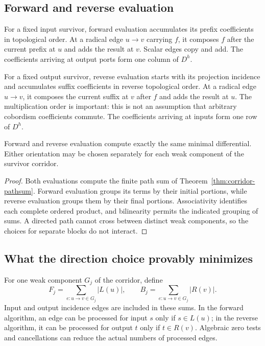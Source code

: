 \subsection{Forward and reverse evaluation}

For a fixed input survivor, forward evaluation accumulates its prefix
coefficients in topological order.  At a radical edge $u\to v$ carrying $f$,
it composes $f$ after the current prefix at $u$ and adds the result at $v$.
Scalar edges copy and add.  The coefficients arriving at output ports form
one column of $D^h$.

For a fixed output survivor, reverse evaluation starts with its projection
incidence and accumulates suffix coefficients in reverse topological order.
At a radical edge $u\to v$, it composes the current suffix at $v$ after $f$
and adds the result at $u$.  The multiplication order is important: this is
not an assumption that arbitrary cobordism coefficients commute.  The
coefficients arriving at inputs form one row of $D^h$.

\begin{theorem}
\label{thm:corridor-bidirectional}
Forward and reverse evaluation compute exactly the same minimal
differential.  Either orientation may be chosen separately for each weak
component of the survivor corridor.
\end{theorem}
\begin{proof}
Both evaluations compute the finite path sum of
Theorem~\ref{thm:corridor-pathsum}.  Forward evaluation groups its terms by
their initial portions, while reverse evaluation groups them by their final
portions.  Associativity identifies each complete ordered product, and
bilinearity permits the indicated grouping of sums.  A directed path cannot
cross between distinct weak components, so the choices for separate blocks
do not interact.
\end{proof}

\subsection{What the direction choice provably minimizes}

For one weak component $G_j$ of the corridor, define
\begin{equation}\label{eq:corridor-unit-bounds}
 F_j=\sum_{e:u\to v\in G_j}|L(u)|,
 \qquad
 B_j=\sum_{e:u\to v\in G_j}|R(v)|.
\end{equation}
Input and output incidence edges are included in these sums.  In the forward
algorithm, an edge can be processed for input $s$ only if $s\in L(u)$;
in the reverse algorithm, it can be processed for output $t$ only if
$t\in R(v)$.  Algebraic zero tests and cancellations can reduce the actual
numbers of processed edges.

